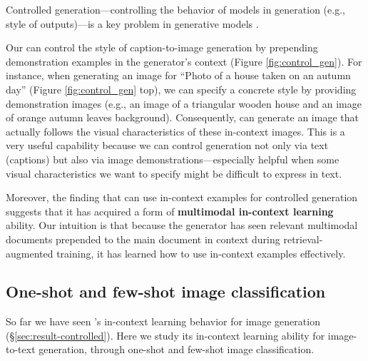 Controlled generation---controlling the behavior of models in generation (e.g., style of outputs)---is a key problem in generative models \cite{keskar2019ctrl, li2019controllable}.

Our \methodname can control the style of caption-to-image generation by prepending demonstration examples in the generator's context (Figure \ref{fig:control_gen}).
For instance, when generating an image for ``Photo of a house taken on an autumn day'' (Figure \ref{fig:control_gen} top), we can specify a concrete style by providing demonstration images (e.g., an image of a triangular wooden house and an image of orange autumn leaves background). Consequently, \methodname can generate an image that actually follows the visual characteristics of these in-context images. 
This is a very useful capability because we can control generation not only via text (captions) but also via image demonstrations---especially helpful when some visual characteristics we want to specify might be difficult to express in text.

Moreover, the finding that \methodname can use in-context examples for controlled generation suggests that it has acquired a form of \textbf{multimodal in-context learning} ability. Our intuition is that because the \methodname generator has seen relevant multimodal documents prepended to the main document in context during retrieval-augmented training, it has learned how to use in-context examples effectively.



\subsection{One-shot and few-shot image classification}
\label{sec:result-oneshot}
So far we have seen \methodname's in-context learning behavior for image generation (\S \ref{sec:result-controlled}). Here we study its in-context learning ability for image-to-text generation, through one-shot and few-shot image classification.

